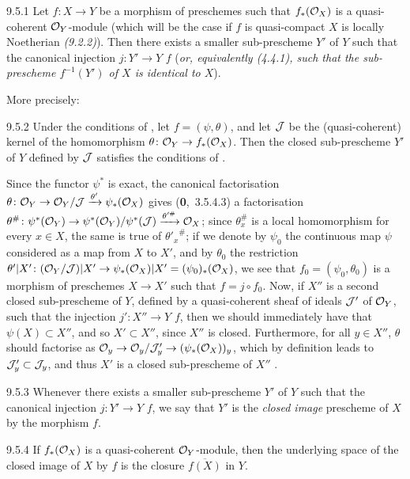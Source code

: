 \documentclass[../main.tex]{subfiles}
\begin{document}
\begin{env}[Proposition]{9.5.1}
    Let $f\colon X\to Y$ be a morphism of preschemes such that $f_*(\mathcal{O}_X)$ is a quasi-coherent $\mathcal{O}_Y$-module (which will be the case if $f$ is quasi-compact  $X$ is locally Noetherian \emph{(9.2.2)}).
    Then there exists a smaller sub-prescheme $Y'$ of $Y$ such that the canonical injection $j\colon Y'\to Y$  $f$ (\emph{or, equivalently (4.4.1), such that the sub-prescheme $f^{-1}(Y')$ of $X$ is \emph{identical} to $X$}).
\end{env}

More precisely:

\begin{env}[Corollary]{9.5.2}
    Under the conditions of , let $f=(\psi,\theta)$, and let $\mathcal{J}$ be the (quasi-coherent) kernel of the homomorphism $\theta\colon\mathcal{O}_Y\to f_*(\mathcal{O}_X)$.
    Then the closed sub-prescheme $Y'$ of $Y$ defined by $\mathcal{J}$ satisfies the conditions of .
\end{env}

Since the functor $\psi^*$ is exact, the canonical factorisation $\theta\colon\mathcal{O}_Y\to\mathcal{O}_Y/\mathcal{J}\xrightarrow{\theta'}\psi_*(\mathcal{O}_X)$ gives (\textbf{0},~3.5.4.3) a factorisation $\theta^\#\colon\psi^*(\mathcal{O}_Y)\to\psi^*(\mathcal{O}_Y)/\psi^*(\mathcal{J})\xrightarrow{\theta'^\#}\mathcal{O}_X$; since $\theta_x^\#$ is a local homomorphism for every $x\in X$, the same is true of ${\theta'_x}^\#$; if we denote by $\psi_0$ the continuous map $\psi$ considered as a map from $X$ to $X'$, and by $\theta_0$ the restriction $\theta'|X'\colon(\mathcal{O}_Y/\mathcal{J})|X'\to\psi_*(\mathcal{O}_X)|X'=(\psi_0)_*(\mathcal{O}_X)$, we see that $f_0=(\psi_0,\theta_0)$ is a morphism of preschemes $X\to X'$  such that $f=j\circ f_0$.
Now, if $X''$ is a second closed sub-prescheme of $Y$, defined by a quasi-coherent sheaf of ideals $\mathcal{J}'$ of $\mathcal{O}_Y$, such that the injection $j'\colon X''\to Y$  $f$, then we should immediately have that $\psi(X)\subset X''$, and so $X'\subset X''$, since $X''$ is closed.
Furthermore, for all $y\in X''$, $\theta$ should factorise as $\mathcal{O}_y\to\mathcal{O}_y/\mathcal{J}'_y\to(\psi_*(\mathcal{O}_X))_y$, which by definition leads to $\mathcal{J}'_y\subset\mathcal{J}_y$, and thus $X'$ is a closed sub-prescheme of $X''$ .

\begin{env}[Definition]{9.5.3}
    Whenever there exists a smaller sub-prescheme $Y'$ of $Y$ such that the canonical injection $j\colon Y'\to Y$  $f$, we say that $Y'$ is the \emph{closed image} prescheme of $X$ by the morphism $f$.
\end{env}

\begin{env}[Proposition]{9.5.4}
    If $f_*(\mathcal{O}_X)$ is a quasi-coherent $\mathcal{O}_Y$-module, then the underlying space of the closed image of $X$ by $f$ is the closure $\overline{f(X)}$ in $Y$.
\end{env}
\end{document}
